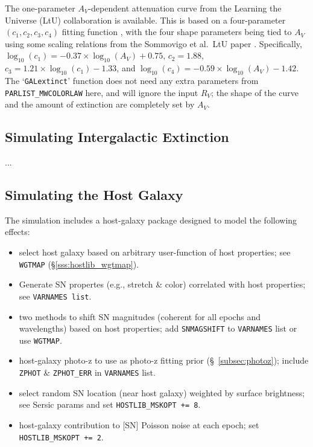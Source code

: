 \documentclass[12pt]{article}
\begin{document}
{The one-parameter $A_V$-dependent attenuation curve from the Learning the
Universe (LtU) collaboration \cite{Sommovigo2025} is available. This is based
on a four-parameter $(c_1, c_2, c_3, c_4)$ fitting function \cite{Pei1992, Li2008},
with the four shape parameters being tied to $A_V$ using some scaling relations
from the Sommovigo et al.\ LtU paper \cite{Sommovigo2025}. 
Specifically, $\log_{10}(c_1)=-0.37\times\log_{10}(A_V) + 0.75$, $c_2=1.88$, 
$c_3 = 1.21\times\log_{10}(c_1) - 1.33$, 
and $\log_{10}(c_4) = -0.59\times\log_{10}(A_V) - 1.42$.
The `\texttt{GALextinct}' function does not need any extra parameters from 
\verb!PARLIST_MWCOLORLAW! here, and will ignore the input $R_V$; the shape of 
the curve and the amount of extinction are completely set by $A_V$.


\subsection{Simulating Intergalactic Extinction}
\label{sss:IGM}

...


\clearpage
\subsection{Simulating the Host Galaxy}
\label{subsec:hostlib}

The simulation includes a host-galaxy
package designed to model the following effects:
\begin{itemize}
%
  \item select host galaxy based on arbitrary user-function
        of host properties; see {\tt WGTMAP} (\S\ref{sss:hostlib_wgtmap}).
%
  \item Generate SN propertes (e.g., stretch \& color) correlated
        with host properties; see {\tt VARNAMES list}.
%
  \item two methods to shift SN magnitudes 
        (coherent for all epochs and wavelengths) 
        based on host properties;
	add {\tt SNMAGSHIFT} to  {\tt VARNAMES} list or use {\tt WGTMAP}.
%
  \item host-galaxy photo-z to use as photo-z fitting prior 
    (\S~\ref{subsec:photoz});
    include {\tt ZPHOT} \& {\tt ZPHOT\_ERR} in {\tt VARNAMES} list.	
%
  \item select random SN location (near host galaxy)
    weighted by surface brightness; see Sersic params
    and set {\tt HOSTLIB\_MSKOPT += 8}.
%
  \item host-galaxy contribution to [SN] Poisson noise at each epoch;
    set {\tt HOSTLIB\_MSKOPT += 2}.
%
\end{itemize} 

}
\end{document}
